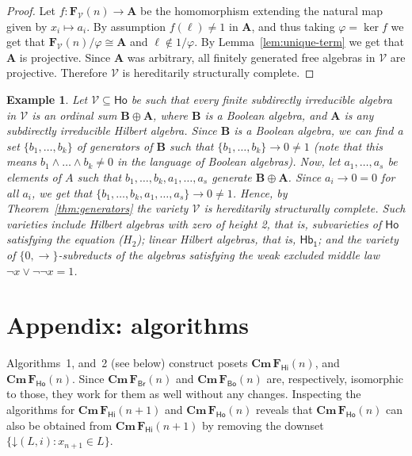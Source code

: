 \documentclass{amsart}
\newtheorem{example}[theorem]{Example}
\newcommand{\alg}[1]{\mathbf{#1}}
\newcommand{\var}[1]{\mathsf{#1}}
\newcommand{\FV}{\alg{F}_\mathcal{V}}
\newcommand{\Cm}[1]{\mathbf{Cm}\, #1}
\def\ra{\rightarrow}
\def\dw#1{{#1}\mathord{\downarrow}}
\begin{document}
\begin{proof}
Let $f\colon\FV(n)\to \alg{A}$ be the homomorphism extending the natural map
given by $x_i\mapsto a_i$. By assumption
$f(\ell) \neq 1$ in $\alg{A}$, and thus taking
$\varphi = \ker{f}$ we get that $\FV(n)/\varphi \cong \alg{A}$
and $\ell\notin 1/\varphi$. By Lemma~\ref{lem:unique-term} we get that
$\alg{A}$ is projective. Since $\alg{A}$ was arbitrary,
all finitely generated free algebras in $\mathcal{V}$ are projective.
Therefore $\mathcal{V}$ is hereditarily structurally complete.
\end{proof}  



\begin{example}
Let $\mathcal{V}\subseteq \var{Ho}$ be such that every finite subdirectly irreducible
algebra in $\mathcal{V}$ is an ordinal sum $\alg{B}\oplus\alg{A}$, where
$\alg{B}$ is a Boolean algebra, and $\alg{A}$ is any subdirectly irreducible
Hilbert algebra. Since $\alg{B}$ is a Boolean algebra, we can find a set
$\{b_1,\dots,b_k\}$ of generators of $\alg{B}$ such that
$\{b_1,\dots, b_k\}\ra 0 \neq 1$ (note that this means $b_1\wedge\dots\wedge
b_k\neq 0$ in the language of Boolean algebras). Now, let $a_1,\dots, a_s$ be
elements of $A$ such that $b_1,\dots,b_k,a_1,\dots,a_s$ generate  
$\alg{B}\oplus\alg{A}$. Since $a_i\ra 0 = 0$ for all $a_i$, we get that
$\{b_1,\dots,b_k,a_1,\dots,a_s\}\ra 0 \neq 1$. Hence, by
Theorem~\ref{thm:generators} the variety $\mathcal{V}$ is hereditarily
structurally complete. Such varieties include
Hilbert algebras with zero of height 2, that is,
subvarieties of $\var{Ho}$ satisfying the equation \textup($H_2$\textup);
linear Hilbert algebras, that is, $\var{Hb_1}$; and the variety of
$\{0,\ra\}$-subreducts of the algebras satisfying the weak excluded middle law
$\neg x\vee \neg\neg x = 1$. 
\end{example}  


\section{Appendix: algorithms}\label{sec:append}
Algorithms~1, and~2 (see below) construct posets $\Cm{\alg{F}_{\var{Hi}}(n)}$,
and $\Cm{\alg{F}_{\var{Ho}}(n)}$. Since $\Cm{\alg{F}_{\var{Br}}(n)}$ and
$\Cm{\alg{F}_{\var{Bo}}(n)}$ are, respectively, isomorphic to those, they work
for them as well without any changes. Inspecting the algorithms for
$\Cm{\alg{F}_{\var{Hi}}(n+1)}$ and $\Cm{\alg{F}_{\var{Ho}}(n)}$ reveals that
$\Cm{\alg{F}_{\var{Ho}}(n)}$ can also be obtained from
$\Cm{\alg{F}_{\var{Hi}}(n+1)}$ by removing the downset $\dw\{(L,i): x_{n+1}\in L\}$. 
\end{document}
